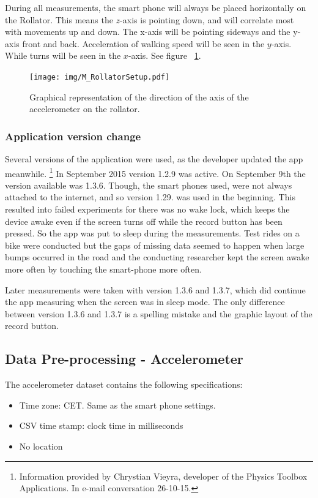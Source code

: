 During all measurements, the smart phone will always be placed horizontally on the Rollator. This means the $z$-axis is pointing down, and will correlate most with movements up and down. The x-axis will be pointing sideways and the y-axis front and back. Acceleration of walking speed will be seen in the $y$-axis. While turns will be seen in the $x$-axis. See figure ~\ref{setup}.
\begin{figure}[t]
\texttt{[image: img/M\_RollatorSetup.pdf]}
\centering
\caption{ Graphical representation of the direction of the axis of the accelerometer on the rollator. \label{setup}}
\end{figure}


\subsubsection{Application version change}
Several versions of the application were used, as the developer updated the app meanwhile. \footnote{Information provided by Chrystian Vieyra, developer of the Physics Toolbox Applications. In e-mail conversation 26-10-15. }
In September 2015 version 1.2.9 was active. On September 9th the version available was 1.3.6. Though, the smart phones used, were not always attached to the internet, and so version 1.29. was used in the beginning. This resulted into failed experiments for there was no wake lock, which keeps the device awake even if the screen turns off while the record button has been pressed. So the app was put to sleep during the measurements. Test rides on a bike were conducted but the gaps of missing data seemed to happen when large bumps occurred in the road and the conducting researcher kept the screen awake more often by touching the smart-phone more often. 

Later measurements were taken with version 1.3.6 and 1.3.7, which did continue the app measuring when the screen was in sleep mode. The only difference between version 1.3.6 and 1.3.7 is a spelling mistake and the graphic layout of the record button.


\subsection{Data Pre-processing - Accelerometer}
The accelerometer dataset contains the following specifications:
\begin{itemize}
\item Time zone: CET. Same as the smart phone settings. 
\item CSV time stamp: clock time in milliseconds
\item No location
\end{itemize}

